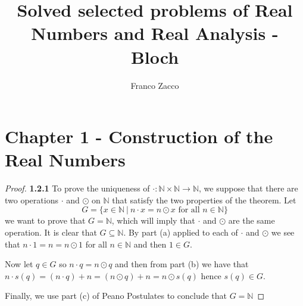 \documentclass[11pt]{article}
\title{\textbf{Solved selected problems of Real Numbers and Real Analysis - Bloch}}
\author{Franco Zacco}
\date{}
\newcommand{\N}{\mathbb{N}}
\theoremstyle{definition}
\begin{document}
\maketitle
\thispagestyle{empty}

\section*{Chapter 1 - Construction of the Real Numbers}

	\begin{proof}{\textbf{1.2.1}}
        To prove the uniqueness of $\cdot:\N\times\N \rightarrow \N$, we
        suppose that there are two operations $\cdot$ and $\odot$ on $\N$ that
        satisfy the two properties of the theorem. Let
        $$G = \{x\in\N~|~n\cdot x = n \odot x\text{ for all }n \in\N \}$$
        we want to prove that $G = \N$, which will imply that $\cdot$ and $\odot$
        are the same operation. It is clear that $G \subseteq \N$. By part (a)
        applied to each of $\cdot$ and $\odot$ we see that
        $n\cdot 1 = n = n \odot 1$ for all $n \in \N$ and then $1 \in G$.
        
        Now let $q \in G$ so $n \cdot q = n \odot q$ and then from part (b) we
        have that $n \cdot s(q) = (n\cdot q) + n = (n\odot q) + n = n\odot s(q)$
        hence $s(q) \in G$.

        Finally, we use part (c) of Peano Postulates to conclude that $G = \N$
    \end{proof}
\end{document}
